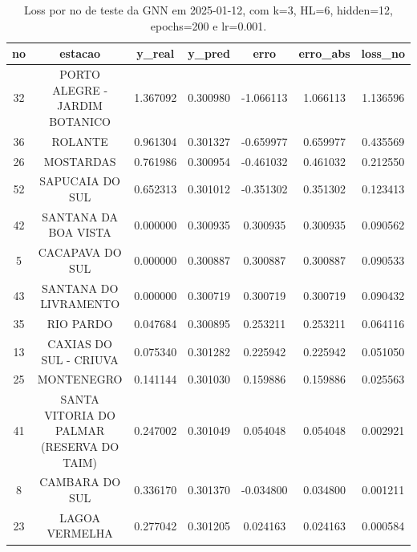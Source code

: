 \begin{table}[h]
\centering
\caption{Loss por no de teste da GNN em 2025-01-12, com k=3, HL=6, hidden=12, epochs=200 e lr=0.001.}
\label{tab:gnn_loss_k3_hl6_h12_e200_d20250112}
\begin{tabular}{ccccccc}
\toprule
no & estacao & y\_real & y\_pred & erro & erro\_abs & loss\_no \\
\midrule
32 & PORTO ALEGRE - JARDIM BOTANICO & 1.367092 & 0.300980 & -1.066113 & 1.066113 & 1.136596 \\
36 & ROLANTE & 0.961304 & 0.301327 & -0.659977 & 0.659977 & 0.435569 \\
26 & MOSTARDAS & 0.761986 & 0.300954 & -0.461032 & 0.461032 & 0.212550 \\
52 & SAPUCAIA DO SUL & 0.652313 & 0.301012 & -0.351302 & 0.351302 & 0.123413 \\
42 & SANTANA DA BOA VISTA & 0.000000 & 0.300935 & 0.300935 & 0.300935 & 0.090562 \\
5 & CACAPAVA DO SUL & 0.000000 & 0.300887 & 0.300887 & 0.300887 & 0.090533 \\
43 & SANTANA DO LIVRAMENTO & 0.000000 & 0.300719 & 0.300719 & 0.300719 & 0.090432 \\
35 & RIO PARDO & 0.047684 & 0.300895 & 0.253211 & 0.253211 & 0.064116 \\
13 & CAXIAS DO SUL - CRIUVA & 0.075340 & 0.301282 & 0.225942 & 0.225942 & 0.051050 \\
25 & MONTENEGRO & 0.141144 & 0.301030 & 0.159886 & 0.159886 & 0.025563 \\
41 & SANTA VITORIA DO PALMAR (RESERVA DO TAIM) & 0.247002 & 0.301049 & 0.054048 & 0.054048 & 0.002921 \\
8 & CAMBARA DO SUL & 0.336170 & 0.301370 & -0.034800 & 0.034800 & 0.001211 \\
23 & LAGOA VERMELHA & 0.277042 & 0.301205 & 0.024163 & 0.024163 & 0.000584 \\
\bottomrule
\end{tabular}
\end{table}
